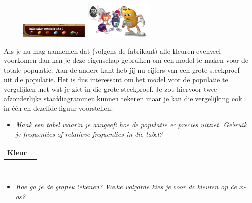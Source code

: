 \documentclass[11pt]{article}
\newcommand{\vraag}[2]{\begin{itemize}\item {\it #1} \vspace*{#2}\end{itemize}}
\begin{document}
\begin{figure}
  \vspace{-0.5cm}
  \includegraphics[width=0.3\textwidth]{MenM-uniforme_verdeling}
  \includegraphics[width=0.3\textwidth]{MenM-hoeveel}
\end{figure}
Als je nu mag aannemen dat (volgens de fabrikant) alle
kleuren evenveel voorkomen dan kan je deze eigenschap
gebruiken om een model te maken voor de totale
populatie. Aan de andere kant heb jij nu cijfers van een
grote steekproef uit die populatie. Het is dus interessant
om het model voor de populatie te vergelijken met wat je
ziet in die grote steekproef. Je zou hiervoor twee
afzonderlijke staafdiagrammen kunnen tekenen maar je
kan die vergelijking ook in één en dezelfde figuur
voorstellen.

\vraag{Maak een tabel waarin je aangeeft hoe de populatie er precies uitziet. Gebruik je frequenties
of relatieve frequenties in die tabel?}{0cm}

\begin{center}
  \begin{tabular}{|p{2cm}|p{2cm}|}
    \hline
    Kleur&\\
    \hline
    &\vspace*{0pt}\\
    \hline
    &\vspace*{0pt}\\
    \hline
    &\vspace*{0pt}\\
    \hline
    &\vspace*{0pt}\\
    \hline
    &\vspace*{0pt}\\
    \hline
    &\vspace*{0pt}\\
    \hline
  \end{tabular}
\end{center}

\vraag{Hoe ga je de grafiek tekenen? Welke volgorde kies je voor de kleuren op de $x$-as?}{3cm}
\end{document}
